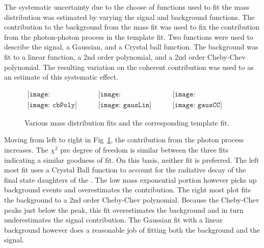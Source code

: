       The systematic uncertainty due to the choose of functions used to fit
        the mass distribution was estimated by varying the signal and 
        background functions.
      The contribution to the background from the mass fit was used to fix the
        contribution from the photon-photon process in the \pt{} template
        fit.
      Two functions were used to describe the signal, a Gaussian, and a Crystal
        ball function. 
      The background was fit to a linear function, a 2nd order polynomial, and
        a 2nd order Cheby-Chev polynomial. 
      The resulting variation on the coherent contribution was used to as an
        estimate of this systematic effect. 

      \begin{figure}[!Hhbt]
        \centering
        $ \begin{array}{ccc}
          \texttt{[image: cbPolyBkgEst]} &
          \texttt{[image: gausLinBkgEst]} &
          \texttt{[image: gausCCBkgEst]} \\
          \texttt{[image: cbPoly]} &
          \texttt{[image: gausLin]} &
          \texttt{[image: gausCC]}
        \end{array} $
        \caption{Various mass distribution fits and the corresponding \pt{}
          template fit.}
        \label{fig:massPtFitsForSyst}
      \end{figure}

      Moving from left to right in Fig~\ref{fig:massPtFitsForSyst}, the 
        contribution from the photon process increases.
      The $\chi^{2}$ pre degree of freedom is similar between the three 
        fits indicating a similar goodness of fit.
      On this basis, neither fit is preferred. 
      The left most fit uses a Crystal Ball function to account for the 
        radiative decay of the final state daughters of the \JPsi{}.
      The low mass exponential portion however picks up background events 
        and overestimates the \JPsi{} contribution. 
      The right most plot fits the background to a 2nd order Cheby-Chev 
        polynomial.
      Because the Cheby-Chev peaks just below the \JPsi{} peak, this fit 
        overestimates the background and in turn underestimates the signal 
        contribution.
      The Gaussian fit with a linear background however does a reasonable job
        of fitting both the background and the signal. 

